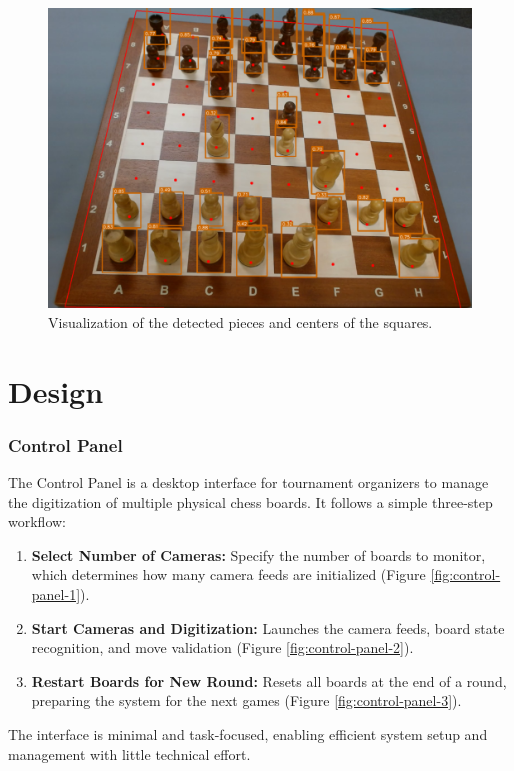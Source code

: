 \begin{figure}[h!]
    \centering
    \includegraphics[width=0.75\linewidth]{figures/methods/ml-models/piece-model.png}
    \caption[Visualization of piece model and corner model]{Visualization of the detected pieces and centers of the squares.}
    \label{fig:websocket-vs-http}
\end{figure}

\section{Design}
\label{subsec:wireframe}

\subsubsection*{Control Panel}

The Control Panel is a desktop interface for tournament organizers to manage the digitization of multiple physical chess boards. It follows a simple three-step workflow:

\begin{enumerate}
\item \textbf{Select Number of Cameras:} Specify the number of boards to monitor, which determines how many camera feeds are initialized (Figure \ref{fig:control-panel-1}).
\item \textbf{Start Cameras and Digitization:} Launches the camera feeds, board state recognition, and move validation (Figure \ref{fig:control-panel-2}).
\item \textbf{Restart Boards for New Round:} Resets all boards at the end of a round, preparing the system for the next games (Figure \ref{fig:control-panel-3}).
\end{enumerate}

The interface is minimal and task-focused, enabling efficient system setup and management with little technical effort. \\

